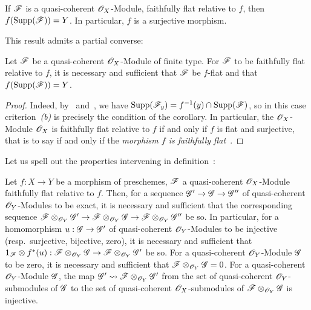\begin{corollary}[2.2.5]
\label{IV.2.2.5}
If $\mathscr{F}$ is a quasi-coherent $\mathscr{O}_X$-Module, faithfully flat relative to $f$, then $f(\operatorname{Supp}(\mathscr{F}))=Y$.
In particular, $f$ is a surjective morphism.
\end{corollary}

This result admits a partial converse:

\begin{corollary}[2.2.6]
\label{IV.2.2.6}
Let $\mathscr{F}$ be a quasi-coherent $\mathscr{O}_X$-Module of finite type. For $\mathscr{F}$ to be faithfully flat relative to $f$, it is necessary and sufficient that $\mathscr{F}$ be $f$-flat and that $f(\operatorname{Supp}(\mathscr{F}))=Y$.
\end{corollary}

\begin{proof}
Indeed, by~ and~, we have $\operatorname{Supp}(\mathscr{F}_y)=f^{-1}(y)\cap\operatorname{Supp}(\mathscr{F})$, so in this case criterion~\emph{(b)} is precisely the condition of the corollary.
In particular, the $\mathscr{O}_X$-Module $\mathscr{O}_X$ is faithfully flat relative to $f$ if and only if $f$ is flat and surjective, that is to say if and only if the \emph{morphism $f$ is faithfully flat}~.
\end{proof}

Let us spell out the properties intervening in definition~:

\begin{proposition}[2.2.7]
\label{IV.2.2.7}
Let $f:X\to Y$ be a morphism of preschemes, $\mathscr{F}$ a quasi-coherent $\mathscr{O}_X$-Module faithfully flat relative to $f$.
Then, for a sequence $\mathscr{G}'\to\mathscr{G}\to\mathscr{G}''$ of quasi-coherent $\mathscr{O}_Y$-Modules to be exact, it is necessary and sufficient that the corresponding sequence $\mathscr{F}\otimes_{\mathscr{O}_Y}\mathscr{G}'\to\mathscr{F}\otimes_{\mathscr{O}_Y}\mathscr{G}\to\mathscr{F}\otimes_{\mathscr{O}_Y}\mathscr{G}''$ be so.
In particular, for a homomorphism $u:\mathscr{G}\to\mathscr{G}'$ of quasi-coherent $\mathscr{O}_Y$-Modules to be injective \textnormal{(resp.}\ surjective, bijective, zero\textnormal{)}, it is necessary and sufficient that $1_{\mathscr{F}}\otimes f^*(u):\mathscr{F}\otimes_{\mathscr{O}_Y}\mathscr{G}\to\mathscr{F}\otimes_{\mathscr{O}_Y}\mathscr{G}'$ be so.
For a quasi-coherent $\mathscr{O}_Y$-Module $\mathscr{G}$ to be zero, it is necessary and sufficient that $\mathscr{F}\otimes_{\mathscr{O}_Y}\mathscr{G}=0$.
For a quasi-coherent $\mathscr{O}_Y$-Module $\mathscr{G}$, the map $\mathscr{G}'\leadsto\mathscr{F}\otimes_{\mathscr{O}_Y}\mathscr{G}'$ from the set of quasi-coherent $\mathscr{O}_Y$-submodules of $\mathscr{G}$ to the set of quasi-coherent $\mathscr{O}_X$-submodules of $\mathscr{F}\otimes_{\mathscr{O}_Y}\mathscr{G}$ is injective.
\end{proposition}

